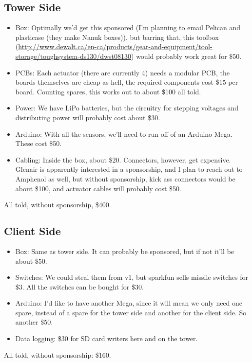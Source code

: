 \documentclass{article}
\begin{document}
        \subsection{Tower Side}
            \begin{itemize}
                \item Box: Optimally we'd get this sponsored (I'm planning to email Pelican and plasticase (they make Nanuk boxes)), but barring that, this toolbox (\url{http://www.dewalt.ca/en-ca/products/gear-and-equipment/tool-storage/toughsystem-ds130/dwst08130}) would probably work great for \$50.
                \item PCBs: Each actuator (there are currently 4) needs a modular PCB, the boards themselves are cheap as hell, the required components cost \$15 per board. Counting spares, this works out to about \$100 all told.
                \item Power: We have LiPo batteries, but the circuitry for stepping voltages and distributing power will probably cost about \$30.
                \item Arduino: With all the sensors, we'll need to run off of an Arduino Mega. These cost \$50.
                \item Cabling: Inside the box, about \$20. Connectors, however, get expensive. Glenair is apparently interested in a sponsorship, and I plan to reach out to Amphenol as well, but without sponsorship, kick ass connectors would be about \$100, and actuator cables will probably cost \$50.
            \end{itemize}
            All told, without sponsorship, \$400.

        \subsection{Client Side}
            \begin{itemize}
                \item Box: Same as tower side. It can probably be sponsored, but if not it'll be about \$50.
                \item Switches: We could steal them from v1, but sparkfun sells missile switches for \$3. All the switches can be bought for \$30.
                \item Arduino: I'd like to have another Mega, since it will mean we only need one spare, instead of a spare for the tower side and another for the client side. So another \$50.
                \item Data logging: \$30 for SD card writers here and on the tower.
            \end{itemize}
            All told, without sponsorship: \$160.
\end{document}
